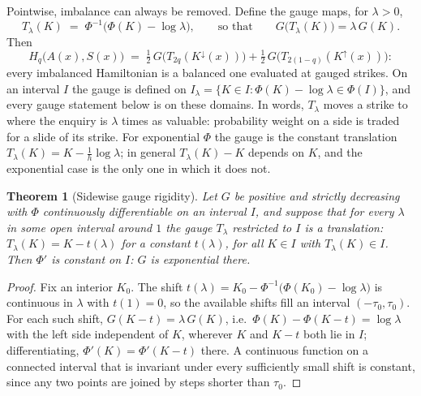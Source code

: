 \documentclass[11pt]{article}
\newtheorem{theorem}{Theorem}
\begin{document}
Pointwise, imbalance can always be removed. Define the gauge maps, for $\lambda > 0$,
\begin{equation}
T_\lambda(K) \;=\; \Phi^{-1}\big(\Phi(K) - \log \lambda\big),
\qquad\text{so that}\qquad
G\big(T_\lambda(K)\big) = \lambda\,G(K).
\label{eq:gauge}
\end{equation}
Then
\begin{equation}
H_q\big(A(x),S(x)\big) \;=\; \tfrac12\, G\big(T_{2q}(K^{\downarrow}(x))\big) + \tfrac12\, G\big(T_{2(1-q)}(K^{\uparrow}(x))\big):
\label{eq:pointwise}
\end{equation}
every imbalanced Hamiltonian is a balanced one evaluated at gauged strikes. On an interval $I$ the gauge is defined on $I_\lambda = \{K \in I : \Phi(K) - \log\lambda \in \Phi(I)\}$, and every gauge statement below is on these domains. In words, $T_\lambda$ moves a strike to where the enquiry is $\lambda$ times as valuable: probability weight on a side is traded for a slide of its strike. For exponential $\Phi$ the gauge is the constant translation $T_\lambda(K) = K - \tfrac1h\log \lambda$; in general $T_\lambda(K) - K$ depends on $K$, and the exponential case is the only one in which it does not.

\begin{theorem}[Sidewise gauge rigidity]\label{thm:rigidity}
Let $G$ be positive and strictly decreasing with $\Phi$ continuously differentiable on an interval $I$, and suppose that for every $\lambda$ in some open interval around $1$ the gauge $T_\lambda$ restricted to $I$ is a translation: $T_\lambda(K) = K - t(\lambda)$ for a constant $t(\lambda)$, for all $K \in I$ with $T_\lambda(K) \in I$. Then $\Phi'$ is constant on $I$: $G$ is exponential there.
\end{theorem}

\begin{proof}
Fix an interior $K_0$. The shift $t(\lambda) = K_0 - \Phi^{-1}\big(\Phi(K_0) - \log\lambda\big)$ is continuous in $\lambda$ with $t(1) = 0$, so the available shifts fill an interval $(-\tau_0, \tau_0)$. For each such shift, $G(K - t) = \lambda\,G(K)$, i.e.\ $\Phi(K) - \Phi(K - t) = \log \lambda$ with the left side independent of $K$, wherever $K$ and $K - t$ both lie in $I$; differentiating, $\Phi'(K) = \Phi'(K - t)$ there. A continuous function on a connected interval that is invariant under every sufficiently small shift is constant, since any two points are joined by steps shorter than $\tau_0$.
\end{proof}
\end{document}
